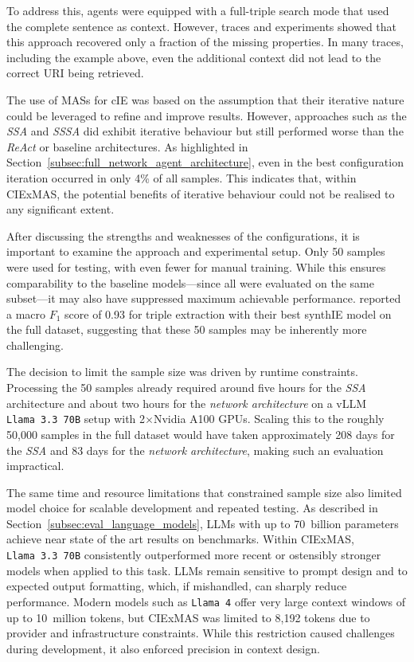 \documentclass[a4paper,oneside,bibliography=totoc]{scrbook}
\begin{document}
To address this, agents were equipped with a full-triple search mode that used the complete sentence as context. However, traces and experiments showed that this approach recovered only a fraction of the missing properties. In many traces, including the example above, even the additional context did not lead to the correct \ac{URI} being retrieved.

The use of \acp{MAS} for \ac{cIE} was based on the assumption that their iterative nature could be leveraged to refine and improve results. However, approaches such as the \textit{\ac{SSA}} and \textit{\ac{SSSA}} did exhibit iterative behaviour but still performed worse than the \textit{ReAct} or baseline architectures. As highlighted in Section~\ref{subsec:full_network_agent_architecture}, even in the best configuration iteration occurred in only 4\% of all samples. This indicates that, within CIExMAS, the potential benefits of iterative behaviour could not be realised to any significant extent.

After discussing the strengths and weaknesses of the configurations, it is important to examine the approach and experimental setup. Only 50 samples were used for testing, with even fewer for manual training. While this ensures comparability to the baseline models—since all were evaluated on the same subset—it may also have suppressed maximum achievable performance. \citet{Josifoski2023} reported a macro $F_{1}$ score of 0.93 for triple extraction with their best synthIE model on the full dataset, suggesting that these 50 samples may be inherently more challenging.

The decision to limit the sample size was driven by runtime constraints. Processing the 50 samples already required around five hours for the \textit{\ac{SSA}} architecture and about two hours for the \textit{network architecture} on a vLLM \texttt{Llama~3.3~70B} setup with 2$\times$Nvidia A100 GPUs. Scaling this to the roughly 50{,}000 samples in the full dataset would have taken approximately 208 days for the \textit{\ac{SSA}} and 83 days for the \textit{network architecture}, making such an evaluation impractical.

The same time and resource limitations that constrained sample size also limited model choice for scalable development and repeated testing. As described in Section~\ref{subsec:eval_language_models}, \acp{LLM} with up to 70~billion parameters achieve near state of the art results on benchmarks. Within CIExMAS, \texttt{Llama~3.3~70B} consistently outperformed more recent or ostensibly stronger models when applied to this task. \acp{LLM} remain sensitive to prompt design and to expected output formatting, which, if mishandled, can sharply reduce performance. Modern models such as \texttt{Llama~4} offer very large context windows of up to 10~million tokens, but CIExMAS was limited to 8{,}192 tokens due to provider and infrastructure constraints. While this restriction caused challenges during development, it also enforced precision in context design.
\end{document}
